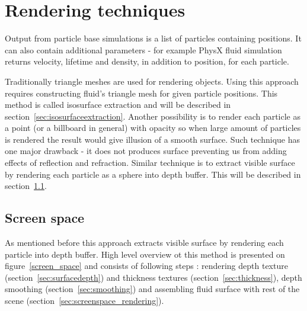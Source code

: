 
\chapter{Rendering techniques} %

\graphicspath{{techniques/figures/}}


Output from particle base simulations is a list of particles containing positions. It can also contain additional parameters - for example PhysX fluid simulation returns velocity, lifetime and density, in addition to position, for each particle. 

Traditionally triangle meshes are used for rendering objects. Using this approach requires constructing fluid's triangle mesh for given particle positions. This method is called isosurface extraction and will be described in section~\ref{sec:isosurfaceextraction}.
Another possibility is to render each particle as a point (or a billboard in general) with opacity so when large amount of particles is rendered the result would give illusion of a smooth surface. Such technique has one major drawback - it does not produces surface preventing us from adding effects of reflection and refraction.
Similar technique is to extract visible surface by rendering each particle as a sphere into depth buffer. This will be described in section~\ref{sec:screen_space}.

\section{Screen space} \label{sec:screen_space}
As mentioned before this approach extracts visible surface by rendering each particle into depth buffer. High level overview ot this method is presented on figure~\ref{screen_space} and consists of following steps \cite{laanSainz2009}: rendering depth texture (section~\ref{sec:surfacedepth}) and thickness textures (section~\ref{sec:thickness}), depth smoothing (section~\ref{sec:smoothing}) and assembling fluid surface with rest of the scene (section~\ref{sec:screenspace_rendering}).

